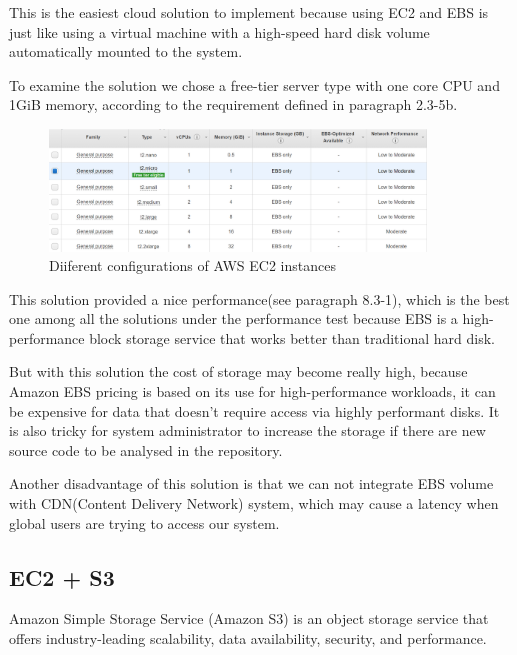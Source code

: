 \documentclass[runningheads]{llncs}
\begin{document}
This is the easiest cloud solution to implement because using EC2 and EBS is just like using a virtual machine with a high-speed hard disk volume automatically mounted to the system.

To examine the solution we chose a free-tier server type with one core CPU and 1GiB memory, according to the requirement defined in paragraph 2.3-5b.

\begin{figure}[H]
	\centering
	\includegraphics[width=10cm]{pic/ec2-free-tier.png}
	\caption{Diiferent configurations of AWS EC2 instances}
	\label{Diiferent configurations of AWS EC2 instances}
\end{figure}

This solution provided a nice performance(see paragraph 8.3-1), which is the best one among all the solutions under the performance test because EBS is a high-performance block storage service that works better than traditional hard disk.

But with this solution the cost of storage may become really high, because Amazon EBS pricing is based on its use for high-performance workloads, it can be expensive for data that doesn’t require access via highly performant disks.\cite{ebs-efs-amazons3} It is also tricky for system administrator to increase the storage if there are new source code to be analysed in the repository.

Another disadvantage of this solution is that we can not integrate EBS volume with CDN(Content Delivery Network)\cite{Content_delivery_network} system, which may cause a latency when global users are trying to access our system.

\subsection{EC2 + S3}

Amazon Simple Storage Service (Amazon S3) is an object storage service that offers industry-leading scalability, data availability, security, and performance.\cite{amazons3}
\end{document}

